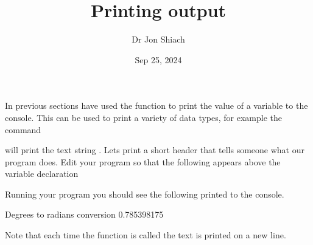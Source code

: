 \documentclass[letterpaper,10pt,english]{jupyterBook}
\title{Printing output}
\date{Sep 25, 2024}
\author{Dr Jon Shiach}
\begin{document}
\pagestyle{empty}
\sphinxmaketitle
\pagestyle{plain}
\sphinxtableofcontents
\pagestyle{normal}
\label{\detokenize{_pages/1.6_Printing_output::doc}}


\sphinxAtStartPar
In previous sections have used the  function to print the value of a variable to the console. This can be used to print a variety of data types, for example the command

\begin{sphinxVerbatim}[commandchars=\\\{\}]
\end{sphinxVerbatim}

\sphinxAtStartPar
will print the text string . Lets print a short header that tells someone what our program does. Edit your program so that the following appears above the  variable declaration

\begin{sphinxVerbatim}[commandchars=\\\{\}]
\end{sphinxVerbatim}

\sphinxAtStartPar
Running your program you should see the following printed to the console.

\begin{sphinxVerbatim}[commandchars=\\\{\}]
Degrees to radians conversion
\PYGZhy{}\PYGZhy{}\PYGZhy{}\PYGZhy{}\PYGZhy{}\PYGZhy{}\PYGZhy{}\PYGZhy{}\PYGZhy{}\PYGZhy{}\PYGZhy{}\PYGZhy{}\PYGZhy{}\PYGZhy{}\PYGZhy{}\PYGZhy{}\PYGZhy{}\PYGZhy{}\PYGZhy{}\PYGZhy{}\PYGZhy{}\PYGZhy{}\PYGZhy{}\PYGZhy{}\PYGZhy{}\PYGZhy{}\PYGZhy{}\PYGZhy{}\PYGZhy{}
0.785398175
\end{sphinxVerbatim}

\sphinxAtStartPar
Note that each time the  function is called the text is printed on a new line.
\end{document}
